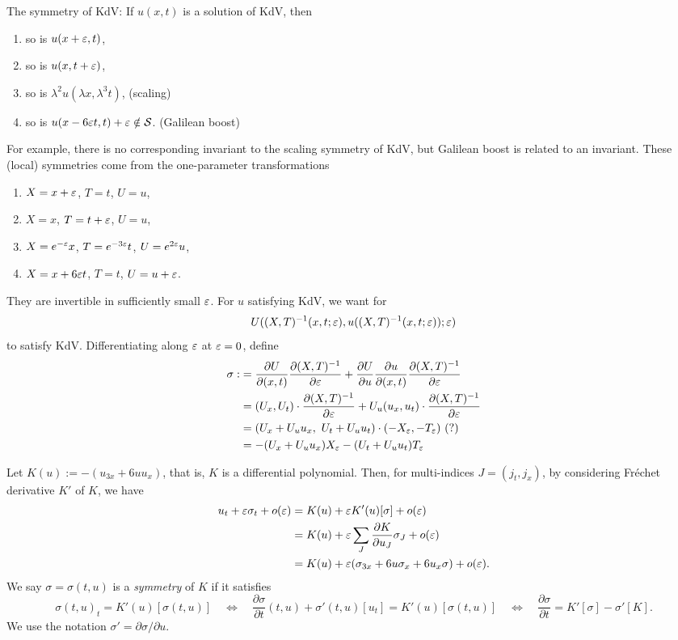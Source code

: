 \documentclass{../../../small}
\begin{document}
The symmetry of KdV: If $u(x,t)$ is a solution of KdV, then
\begin{enumerate}
\item so is $u(x+\varepsilon,t)$,
\item so is $u(x,t+\varepsilon)$,
\item so is $\lambda^2u(\lambda x,\lambda^3t)$, (scaling)
\item so is $u(x-6\varepsilon t,t)+\varepsilon\notin\mathcal{S}$. (Galilean boost)
\end{enumerate}
For example, there is no corresponding invariant to the scaling symmetry of KdV, but Galilean boost is related to an invariant.
These (local) symmetries come from the one-parameter transformations
\begin{enumerate}
\item $X=x+\varepsilon$, $T=t$, $U=u$,
\item $X=x$, $T=t+\varepsilon$, $U=u$,
\item $X=e^{-\varepsilon}x$, $T=e^{-3\varepsilon}t$, $U=e^{2\varepsilon}u$,
\item $X=x+6\varepsilon t$, $T=t$, $U=u+\varepsilon$.
\end{enumerate}
They are invertible in sufficiently small $\varepsilon$.
For $u$ satisfying KdV, we want for
\[U((X,T)^{-1}(x,t;\varepsilon),u((X,T)^{-1}(x,t;\varepsilon));\varepsilon)\]
to satisfy KdV.
Differentiating along $\varepsilon$ at $\varepsilon=0$, define
\begin{align*}
\sigma:&=\frac{\partial U}{\partial(x,t)}\frac{\partial(X,T)^{-1}}{\partial\varepsilon}+\frac{\partial U}{\partial u}\frac{\partial u}{\partial (x,t)}\frac{\partial(X,T)^{-1}}{\partial\varepsilon}\\
&=(U_x,U_t)\cdot\frac{\partial(X,T)^{-1}}{\partial\varepsilon}+U_u(u_x,u_t)\cdot\frac{\partial(X,T)^{-1}}{\partial\varepsilon}\\
&=(U_x+U_uu_x,\ U_t+U_uu_t)\cdot(-X_\varepsilon,-T_\varepsilon)\ (?)\\
&=-(U_x+U_uu_x)X_\varepsilon-(U_t+U_uu_t)T_\varepsilon
\end{align*}

Let $K(u):=-(u_{3x}+6uu_x)$, that is, $K$ is a differential polynomial.
Then, for multi-indices $J=(j_t,j_x)$, by considering Fr\'echet derivative $K'$ of $K$, we have
\begin{align*}
u_t+\varepsilon\sigma_t+o(\varepsilon)
&=K(u)+\varepsilon K'(u)[\sigma]+o(\varepsilon)\\
&=K(u)+\varepsilon\sum_J\frac{\partial K}{\partial u_J}\sigma_J+o(\varepsilon)\\
&=K(u)+\varepsilon(\sigma_{3x}+6u\sigma_x+6u_x\sigma)+o(\varepsilon).
\end{align*}
We say $\sigma=\sigma(t,u)$ is a \emph{symmetry} of $K$ if it satisfies
\[\sigma(t,u)_t=K'(u)[\sigma(t,u)]\quad\Leftrightarrow\quad\frac{\partial\sigma}{\partial t}(t,u)+\sigma'(t,u)[u_t]=K'(u)[\sigma(t,u)]\quad\Leftrightarrow\quad\frac{\partial\sigma}{\partial t}=K'[\sigma]-\sigma'[K].\]
We use the notation $\sigma'=\partial\sigma/\partial u$.
\end{document}

